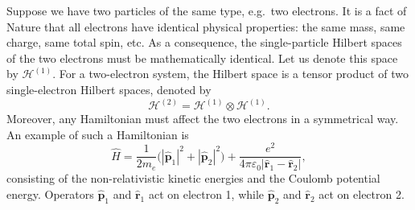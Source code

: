 \documentclass[pra,12pt]{revtex4-2}
\begin{document}
Suppose we have two particles of the same type, e.g.~two electrons.
It is a fact of Nature that all electrons have identical physical
properties: the same mass, same charge, same total spin, etc.  As a
consequence, the single-particle Hilbert spaces of the two electrons
must be mathematically identical.  Let us denote this space by
$\mathscr{H}^{(1)}$.  For a two-electron system, the Hilbert space is
a tensor product of two single-electron Hilbert spaces, denoted by
\begin{equation}
  \mathscr{H}^{(2)} = \mathscr{H}^{(1)} \otimes \mathscr{H}^{(1)}.
\end{equation}
Moreover, any Hamiltonian must affect the two electrons in a
symmetrical way.  An example of such a Hamiltonian is
\begin{equation}
  \hat{H} = \frac{1}{2m_e} \Big(|\hat{\mathbf{p}}_1|^2 + |\hat{\mathbf{p}}_2|^2\Big) + \frac{e^2}{4\pi\varepsilon_0|\hat{\mathbf{r}}_1 - \hat{\mathbf{r}}_2|},
\end{equation}
consisting of the non-relativistic kinetic energies and the Coulomb
potential energy.  Operators $\hat{\mathbf{p}}_1$ and
$\hat{\mathbf{r}}_1$ act on electron 1, while $\hat{\mathbf{p}}_2$ and
$\hat{\mathbf{r}}_2$ act on electron 2.
\end{document}

